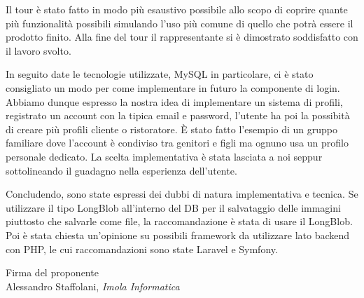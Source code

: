 \documentclass[a4paper, 11pt]{article}
\begin{document}
Il tour è stato fatto in modo più esaustivo possibile allo scopo di coprire quante più funzionalità possibili simulando l'uso più comune di quello che potrà essere il prodotto finito.
Alla fine del tour il rappresentante si è dimostrato soddisfatto con il lavoro svolto.

In seguito date le tecnologie utilizzate, MySQL in particolare, ci è stato consigliato un modo per come implementare in futuro la componente di login. Abbiamo dunque espresso la nostra idea di implementare un sistema di profili, registrato un account con la tipica email e password, l'utente ha poi la possibità di creare più profili cliente o ristoratore. È stato fatto l'esempio di un gruppo familiare dove l'account è condiviso tra genitori e figli ma ognuno usa un profilo personale dedicato.
La scelta implementativa è stata lasciata a noi seppur sottolineando il guadagno nella esperienza dell'utente.

Concludendo, sono state espressi dei dubbi di natura implementativa e tecnica.
Se utilizzare il tipo LongBlob all'interno del DB per il salvataggio delle immagini piuttosto che salvarle come file, la raccomandazione è stata di usare il LongBlob.
Poi è stata chiesta un'opinione su possibili framework da utilizzare lato backend con PHP, le cui raccomandazioni sono state Laravel e Symfony.

\vspace{100pt}
\begin{flushleft}
\hfill Firma del proponente \\
\vspace{50pt}
\hfill Alessandro Staffolani, \textit{Imola Informatica}
\end{flushleft}
\end{document}
